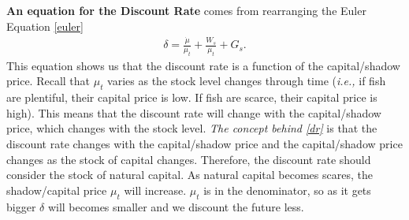 \documentclass{article}
\begin{document}
\textbf{An equation for the Discount Rate} comes from rearranging the Euler Equation \ref{euler}
\begin{align}
    \delta = \frac{\dot \mu}{\mu_t} + \frac{W_s}{\mu_t} + G_s.
    \label{dr}
\end{align}
This equation shows us that the discount rate is a function of the capital/shadow price. Recall that $\mu_t$ varies as the stock level changes through time (\textit{i.e.,} if fish are plentiful, their capital price is low. If fish are scarce, their capital price is high). This means that the discount rate will change with the capital/shadow price, which changes with the stock level. \textit{The concept behind \ref{dr}} is that the discount rate changes with the capital/shadow price and the capital/shadow price changes as the stock of capital changes. Therefore, the discount rate should consider the stock of natural capital. As natural capital becomes scares, the shadow/capital price $\mu_t$ will increase. $\mu_t$ is in the denominator, so as it gets bigger $\delta$ will becomes smaller and we discount the future less. 
\end{document}
